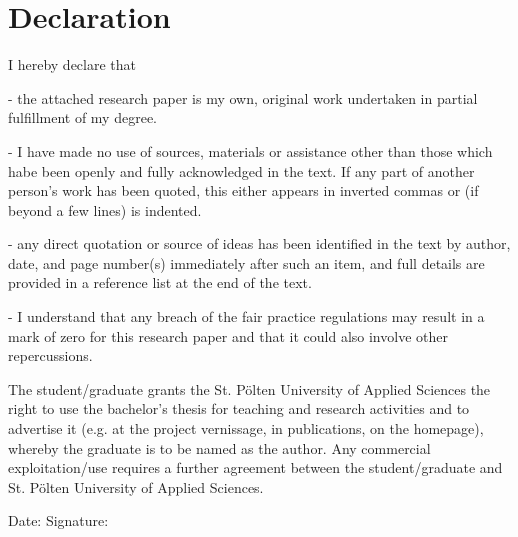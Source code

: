 \chapter*{Declaration}
\label{ch:declaration}

I hereby declare that

\begin{justify}
- the attached research paper is my own, original work undertaken in partial fulfillment of my degree.
\end{justify}

\begin{justify}
- I have made no use of sources, materials or assistance other than those which habe been openly and fully acknowledged in the text. If any part of another person’s work has been quoted, this either appears in inverted commas or (if beyond a few lines) is indented.
\end{justify}

\begin{justify}
- any direct quotation or source of ideas has been identified in the text by author, date, and page number(s) immediately after such an item, and full details are provided in a reference list at the end of the text.
\end{justify}

\begin{justify}
- I understand that any breach of the fair practice regulations may result in a mark of zero for this research paper and that it could also involve other repercussions.
\end{justify}

\begin{justify}
The student/graduate grants the St. Pölten  University of Applied Sciences the right to use the bachelor's thesis for teaching and research activities and to advertise it (e.g. at the project vernissage, in publications, on the homepage), whereby the graduate is to be named as the author. Any commercial exploitation/use requires a further agreement between the student/graduate and St. Pölten University of Applied Sciences. \\[1.5cm]
\end{justify}

Date:	\hrulefill\enspace Signature: \hrulefill
\\[3.5cm]